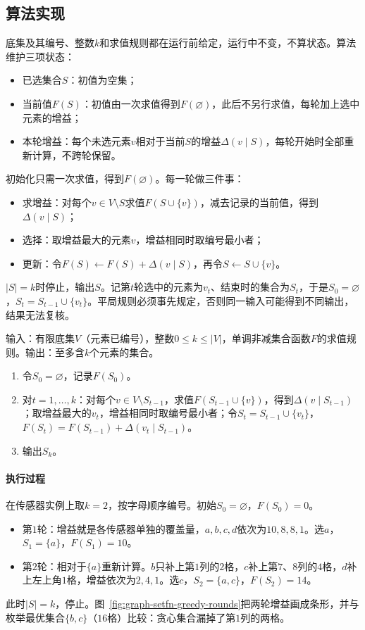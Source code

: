 \subsection{算法实现}
\label{sec:graph-setfn-greedy}

底集及其编号、整数$k$和求值规则都在运行前给定，运行中不变，不算状态。算法维护三项状态：
\begin{itemize}
  \item 已选集合$S$：初值为空集；
  \item 当前值$F(S)$：初值由一次求值得到$F(\varnothing)$，此后不另行求值，每轮加上选中元素的增益；
  \item 本轮增益：每个未选元素$v$相对于当前$S$的增益$\Delta(v\mid S)$，每轮开始时全部重新计算，不跨轮保留。
\end{itemize}
初始化只需一次求值，得到$F(\varnothing)$。每一轮做三件事：
\begin{itemize}
  \item 求增益：对每个$v\in V\setminus S$求值$F(S\cup\{v\})$，减去记录的当前值，得到$\Delta(v\mid S)$；
  \item 选择：取增益最大的元素$v$，增益相同时取编号最小者；
  \item 更新：令$F(S)\gets F(S)+\Delta(v\mid S)$，再令$S\gets S\cup\{v\}$。
\end{itemize}
$|S|=k$时停止，输出$S$。记第$t$轮选中的元素为$v_t$、结束时的集合为$S_t$，于是$S_0=\varnothing$，$S_t=S_{t-1}\cup\{v_t\}$。平局规则必须事先规定，否则同一输入可能得到不同输出，结果无法复核。

\begin{algorithm}[基数约束下的边际增益贪心]
\label{alg:graph-setfn-greedy}
输入：有限底集$V$（元素已编号），整数$0\leq k\leq|V|$，单调非减集合函数$F$的求值规则。输出：至多含$k$个元素的集合。
\begin{enumerate}
  \item 令$S_0=\varnothing$，记录$F(S_0)$。
  \item 对$t=1,\ldots,k$：对每个$v\in V\setminus S_{t-1}$，求值$F(S_{t-1}\cup\{v\})$，得到$\Delta(v\mid S_{t-1})$；取增益最大的$v_t$，增益相同时取编号最小者；令$S_t=S_{t-1}\cup\{v_t\}$，$F(S_t)=F(S_{t-1})+\Delta(v_t\mid S_{t-1})$。
  \item 输出$S_k$。
\end{enumerate}
\end{algorithm}

\paragraph{执行过程}
在传感器实例上取$k=2$，按字母顺序编号。初始$S_0=\varnothing$，$F(S_0)=0$。
\begin{itemize}
  \item 第$1$轮：增益就是各传感器单独的覆盖量，$a,b,c,d$依次为$10,8,8,1$。选$a$，$S_1=\{a\}$，$F(S_1)=10$。
  \item 第$2$轮：相对于$\{a\}$重新计算。$b$只补上第$1$列的$2$格，$c$补上第$7$、$8$列的$4$格，$d$补上左上角$1$格，增益依次为$2,4,1$。选$c$，$S_2=\{a,c\}$，$F(S_2)=14$。
\end{itemize}
此时$|S|=k$，停止。图~\ref{fig:graph-setfn-greedy-rounds}把两轮增益画成条形，并与枚举最优集合$\{b,c\}$（$16$格）比较：贪心集合漏掉了第$1$列的两格。

